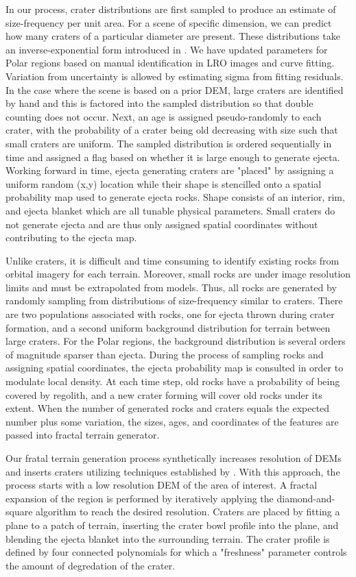 \documentclass[twocolumn,letterpaper]{IEEEAerospaceCLS}  %
\begin{document}
In our process, crater distributions are first sampled to produce an estimate of size-frequency per unit area. 
For a scene of specific dimension, we can predict how many craters of a particular diameter are present. 
These distributions take an inverse-exponential form introduced in \cite{Surveyor1968}. 
We have updated parameters for Polar regions based on manual identification in LRO images and curve fitting. 
Variation from uncertainty is allowed by estimating sigma from fitting residuals. 
In the case where the scene is based on a prior DEM, large craters are identified by hand and this is factored into the sampled distribution so that double counting does not occur. 
Next, an age is assigned pseudo-randomly to each crater, with the probability of a crater being old decreasing with size such that small craters are uniform. 
The sampled distribution is ordered sequentially in time and assigned a flag based on whether it is large enough to generate ejecta. 
Working forward in time, ejecta generating craters are "placed" by assigning a uniform random (x,y) location while their shape is stencilled onto a spatial probability map used to generate ejecta rocks. 
Shape consists of an interior, rim, and ejecta blanket which are all tunable physical parameters. 
Small craters do not generate ejecta and are thus only assigned spatial coordinates without contributing to the ejecta map.           

Unlike craters, it is difficult and time consuming to identify existing rocks from orbital imagery for each terrain. 
Moreover, small rocks are under image resolution limits and must be extrapolated from models. 
Thus, all rocks are generated by randomly sampling from distributions of size-frequency similar to craters. 
There are two populations associated with rocks, one for ejecta thrown during crater formation, and a second uniform background distribution for terrain between large craters. 
For the Polar regions, the background distribution is several orders of magnitude sparser than ejecta. 
During the process of sampling rocks and assigning spatial coordinates, the ejecta probability map is consulted in order to modulate local density. 
At each time step, old rocks have a probability of being covered by regolith, and a new crater forming will cover old rocks under its extent. 
When the number of generated rocks and craters equals the expected number plus some variation, the sizes, ages, and coordinates of the features are passed into fractal terrain generator.     

Our fratal terrain generation process synthetically increases resolution of DEMs and inserts craters utilizing techniques established by \cite{parkes2004planet}. 
With this approach, the process starts with a low resolution DEM of the area of interest.
A fractal expansion of the region is performed by iteratively applying the diamond-and-square algorithm to reach the desired resolution. 
Craters are placed by fitting a plane to a patch of terrain, inserting the crater bowl profile into the plane, and blending the ejecta blanket into the surrounding terrain. 
The crater profile is defined by four connected polynomials for which a "freshness" parameter controls the amount of degredation of the crater. 
\end{document}
